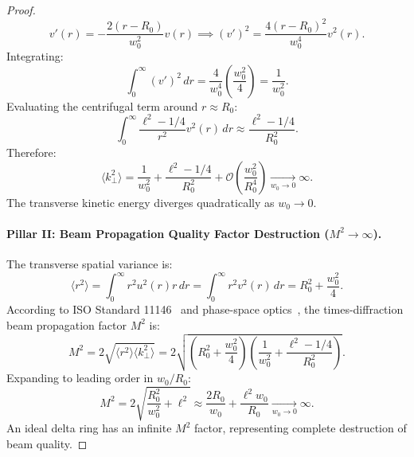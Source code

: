 \documentclass[11pt,a4paper]{article}
\begin{document}
\begin{proof}
\begin{equation}
v'(r) = - \frac{2(r - R_0)}{w_0^2} v(r) \implies (v')^2 = \frac{4(r - R_0)^2}{w_0^4} v^2(r).
\label{eq:v_prime_squared}
\end{equation}
Integrating:
\begin{equation}
\int_0^\infty (v')^2 \, dr = \frac{4}{w_0^4} \left( \frac{w_0^2}{4} \right) = \frac{1}{w_0^2}.
\label{eq:v_prime_integral}
\end{equation}
Evaluating the centrifugal term around $r \approx R_0$:
\begin{equation}
\int_0^\infty \frac{\ell^2 - 1/4}{r^2} v^2(r) \, dr \approx \frac{\ell^2 - 1/4}{R_0^2}.
\label{eq:centrifugal_integral}
\end{equation}
Therefore:
\begin{equation}
\boxed{\langle k_\perp^2 \rangle = \frac{1}{w_0^2} + \frac{\ell^2 - 1/4}{R_0^2} + \mathcal{O}\left( \frac{w_0^2}{R_0^4} \right) \xrightarrow[w_0 \to 0]{} \infty.}
\label{eq:pillar1_result}
\end{equation}
The transverse kinetic energy diverges quadratically as $w_0 \to 0$.

\paragraph{Pillar II: Beam Propagation Quality Factor Destruction ($M^2 \to \infty$).}
The transverse spatial variance is:
\begin{equation}
\langle r^2 \rangle = \int_0^\infty r^2 u^2(r) r \, dr = \int_0^\infty r^2 v^2(r) \, dr = R_0^2 + \frac{w_0^2}{4}.
\label{eq:spatial_variance}
\end{equation}
According to ISO Standard 11146~\cite{ISO11146} and phase-space optics~\cite{Alonso2011}, the times-diffraction beam propagation factor $M^2$ is:
\begin{equation}
M^2 = 2 \sqrt{\langle r^2 \rangle \langle k_\perp^2 \rangle} = 2 \sqrt{\left( R_0^2 + \frac{w_0^2}{4} \right)\left( \frac{1}{w_0^2} + \frac{\ell^2 - 1/4}{R_0^2} \right)}.
\label{eq:m2_formula}
\end{equation}
Expanding to leading order in $w_0 / R_0$:
\begin{equation}
\boxed{M^2 = 2 \sqrt{\frac{R_0^2}{w_0^2} + \ell^2} \approx \frac{2 R_0}{w_0} + \frac{\ell^2 w_0}{R_0} \xrightarrow[w_0 \to 0]{} \infty.}
\label{eq:pillar2_result}
\end{equation}
An ideal delta ring has an infinite $M^2$ factor, representing complete destruction of beam quality.


\end{proof}
\end{document}

